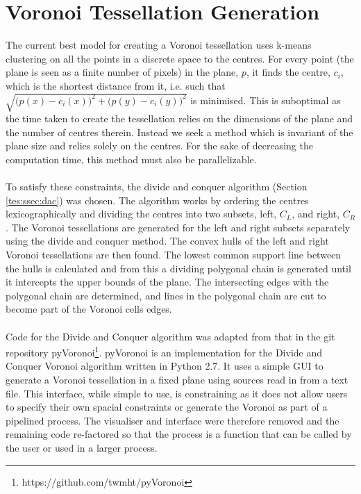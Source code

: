 \section{Voronoi Tessellation Generation}
The current best model for creating a Voronoi tessellation uses k-means clustering on all the points in a discrete space to the centres. For every point (the plane is seen as a finite number of pixels) in the plane, $p$, it finds the centre, $c_i$, which is the shortest distance from it, i.e. such that $\sqrt{\big(p(x)-c_i(x)\big)^2 + \big(p(y)-c_i(y)\big)^2}$ is minimised. This is suboptimal as the time taken to create the tessellation relies on the dimensions of the plane and the number of centres therein. Instead we seek a method which is invariant of the plane size and relies solely on the centres. For the sake of decreasing the computation time, this method must also be parallelizable. 
\\
\\
To satisfy these constraints, the divide and conquer algorithm (Section \ref{tes:ssec:dac}) was chosen. The algorithm works by ordering the centres lexicographically and dividing the centres into two subsets, left, $C_L$, and right, $C_R$. The Voronoi tessellations are generated for the left and right subsets separately using the divide and conquer method. The convex hulls of the left and right Voronoi tessellations are then found. The lowest common support line between the hulls is calculated and from this a dividing polygonal chain is generated until it intercepts the upper bounds of the plane. The intersecting edges with the polygonal chain are determined, and lines in the polygonal chain are cut to become part of the Voronoi cells edges.
\\
\\
Code for the Divide and Conquer algorithm was adapted from that in the git repository pyVoronoi\footnote{https://github.com/twmht/pyVoronoi}. pyVoronoi is an implementation for the Divide and Conquer Voronoi algorithm written in Python 2.7. It uses a simple GUI to generate a Voronoi tessellation in a fixed plane using sources read in from a text file. This interface, while simple to use, is constraining as it does not allow users to specify their own spacial constraints or generate the Voronoi as part of a pipelined process. The visualiser and interface were therefore removed and the remaining code re-factored so that the process is a function that can be called by the user or used in a larger process.

